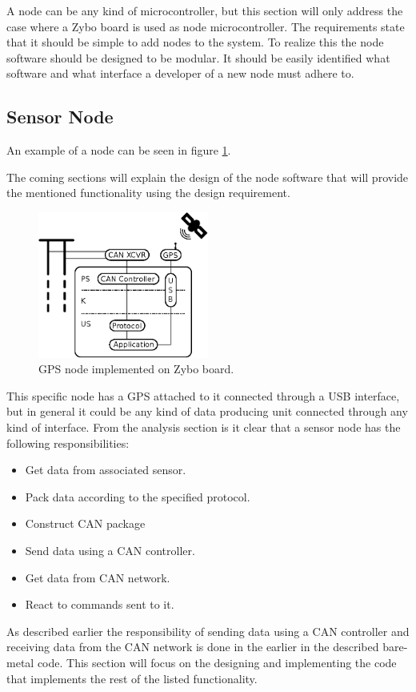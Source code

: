 
A node can be any kind of microcontroller, but this section will only address the case where a Zybo board is used as node microcontroller. 
The requirements state that it should be simple to add nodes to the system. 
To realize this the node software should be designed to be modular.
It should be easily identified what software and what interface a developer of a new node must adhere to.


\subsection{Sensor Node}\label{sec:sensor_node}
An example of a node can be seen in figure \ref{fig:gps_node}.


The coming sections will explain the design of the node software that will provide the mentioned functionality using the design requirement.


\begin{figure}[!h]
\centering
\includegraphics[width=0.5\textwidth]{graphics/analysis_gps.eps}
\caption{GPS node implemented on Zybo board.}
\label{fig:gps_node}
\end{figure}

This specific node has a GPS attached to it connected through a USB interface, but in general it could be any kind of data producing unit connected through any kind of interface.
From the analysis section is it clear that a sensor node has the following responsibilities:

\begin{itemize}
\item Get data from associated sensor.
\item Pack data according to the specified protocol.
\item Construct CAN package
\item Send data using a CAN controller.
\item Get data from CAN network.
\item React to commands sent to it.
\end{itemize}
As described earlier the responsibility of sending data using a CAN controller and receiving data from the CAN network is done in the earlier in the described bare-metal code.
This section will focus on the designing and implementing the code that implements the rest of the listed functionality.

